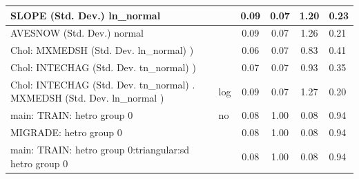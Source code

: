 \begin{table}
\begin{center}
\begin{tabular}{|l|l|c|c|c|l|}
			\hline
			SLOPE (Std. Dev.) ln_normal &  & 0.09 & 0.07 & 1.20 & 0.23 \\
			\hline
			AVESNOW (Std. Dev.) normal &  & 0.09 & 0.07 & 1.26 & 0.21 \\
			\hline
			 Chol: MXMEDSH (Std. Dev. ln_normal) ) &  & 0.06 & 0.07 & 0.83 & 0.41 \\
			\hline
			 Chol: INTECHAG (Std. Dev. tn_normal) ) &  & 0.07 & 0.07 & 0.93 & 0.35 \\
			\hline
			 Chol: INTECHAG (Std. Dev. tn_normal) . MXMEDSH (Std. Dev.   ln_normal ) & log & 0.09 & 0.07 & 1.27 & 0.20 \\
			\hline
			main: TRAIN: hetro group 0 & no & 0.08 & 1.00 & 0.08 & 0.94 \\
			\hline
			MIGRADE: hetro group 0 &  & 0.08 & 1.00 & 0.08 & 0.94 \\
			\hline
			main: TRAIN: hetro group 0:triangular:sd  hetro group 0 &  & 0.08 & 1.00 & 0.08 & 0.94 \\
			\hline
		\end{tabular}
	\end{center}
\end{table}